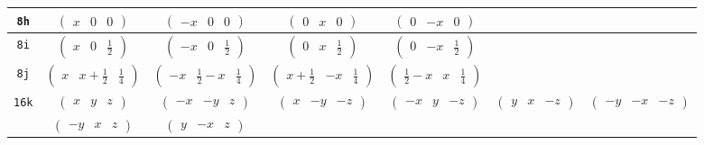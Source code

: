 \documentclass[fleqn,9pt,landscape]{jsarticle}
\begin{document}
\begin{center}
\begin{longtable}{ccccccc}
{\tt 8h} & $ \begin{pmatrix} x & 0 & 0 \end{pmatrix} $ & $ \begin{pmatrix} - x & 0 & 0 \end{pmatrix} $ & $ \begin{pmatrix} 0 & x & 0 \end{pmatrix} $ & $ \begin{pmatrix} 0 & - x & 0 \end{pmatrix} $ & $  $ & $  $ \\ \hline
{\tt 8i} & $ \begin{pmatrix} x & 0 & \frac{1}{2} \end{pmatrix} $ & $ \begin{pmatrix} - x & 0 & \frac{1}{2} \end{pmatrix} $ & $ \begin{pmatrix} 0 & x & \frac{1}{2} \end{pmatrix} $ & $ \begin{pmatrix} 0 & - x & \frac{1}{2} \end{pmatrix} $ & $  $ & $  $ \\ \hline
{\tt 8j} & $ \begin{pmatrix} x & x + \frac{1}{2} & \frac{1}{4} \end{pmatrix} $ & $ \begin{pmatrix} - x & \frac{1}{2} - x & \frac{1}{4} \end{pmatrix} $ & $ \begin{pmatrix} x + \frac{1}{2} & - x & \frac{1}{4} \end{pmatrix} $ & $ \begin{pmatrix} \frac{1}{2} - x & x & \frac{1}{4} \end{pmatrix} $ & $  $ & $  $ \\ \hline
{\tt 16k} & $ \begin{pmatrix} x & y & z \end{pmatrix} $ & $ \begin{pmatrix} - x & - y & z \end{pmatrix} $ & $ \begin{pmatrix} x & - y & - z \end{pmatrix} $ & $ \begin{pmatrix} - x & y & - z \end{pmatrix} $ & $ \begin{pmatrix} y & x & - z \end{pmatrix} $ & $ \begin{pmatrix} - y & - x & - z \end{pmatrix} $ \\
& $ \begin{pmatrix} - y & x & z \end{pmatrix} $ & $ \begin{pmatrix} y & - x & z \end{pmatrix} $ & $  $ & $  $ & $  $ & $  $ \\
\end{longtable}
\end{center}
\end{document}
